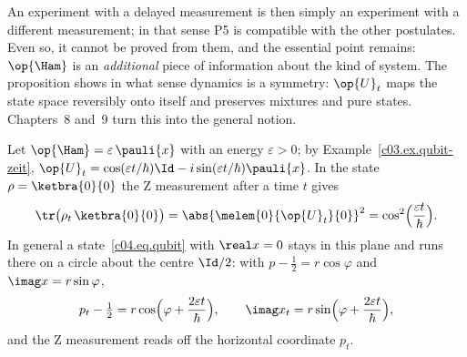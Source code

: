 An experiment with a delayed measurement is then simply an experiment with a different
measurement; in that sense P5 is compatible with the other postulates. Even so, it cannot be
proved from them, and the essential point remains: $\op{\Ham}$ is an \emph{additional} piece of
information about the kind of system. The proposition shows in what sense
dynamics is a symmetry: $\op{U}_t$ maps the state space reversibly onto itself and preserves
mixtures and pure states. Chapters~8 and~9 turn this into the general notion.

\begin{example}\label{c04.ex.qubit-dynamik}
  Let $\op{\Ham} = \varepsilon\,\pauli{x}$ with an energy $\varepsilon > 0$; by
  Example~\ref{c03.ex.qubit-zeit},
  $\op{U}_t = \cos(\varepsilon t/\hbar)\Id - i\sin(\varepsilon t/\hbar)\pauli{x}$. In the state
  $\rho = \ketbra{0}{0}$ the Z measurement after a time $t$ gives
  \begin{equation}\label{c04.eq.rabi}
    \tr\bigl(\rho_t\,\ketbra{0}{0}\bigr) = \abs{\melem{0}{\op{U}_t}{0}}^2 = \cos^2\Bigl(\frac{\varepsilon t}{\hbar}\Bigr) .
  \end{equation}
  In general a state~\eqref{c04.eq.qubit} with $\real x = 0$ stays in this plane and runs there on
  a circle about the centre $\Id/2$: with $p - \tfrac12 = r\cos\varphi$ and
  $\imag x = r\sin\varphi$,
  \begin{equation}\label{c04.eq.kreis}
    p_t - \tfrac12 = r\cos\Bigl(\varphi + \frac{2\varepsilon t}{\hbar}\Bigr) ,
    \qquad
    \imag x_t = r\sin\Bigl(\varphi + \frac{2\varepsilon t}{\hbar}\Bigr) ,
  \end{equation}
  and the Z measurement reads off the horizontal coordinate $p_t$.
\end{example}

